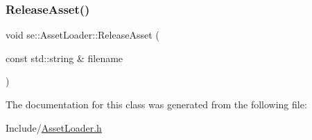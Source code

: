 \subsubsection{\texorpdfstring{Release\+Asset()}{ReleaseAsset()}}
{\footnotesize\ttfamily void se\+::\+Asset\+Loader\+::\+Release\+Asset (\begin{DoxyParamCaption}\item[{const std\+::string \&}]{filename }\end{DoxyParamCaption})}



The documentation for this class was generated from the following file\+:\begin{DoxyCompactItemize}
\item 
Include/\mbox{\hyperlink{_asset_loader_8h}{Asset\+Loader.\+h}}\end{DoxyCompactItemize}

